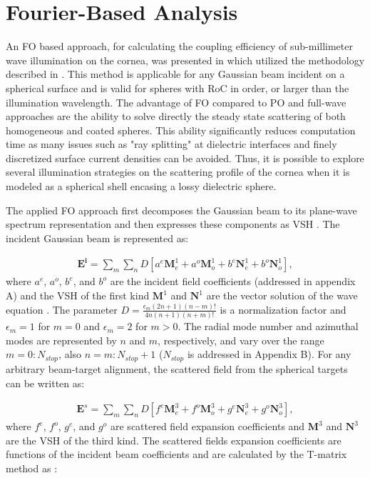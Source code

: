 \documentclass{osa-article}
\begin{document}
\section{Fourier-Based Analysis}

An FO based approach, for calculating the coupling efficiency of sub-millimeter wave illumination on the cornea, was presented in \cite{eucap} which utilized the methodology described in \cite{esam93}. This method is applicable for any Gaussian beam incident on a spherical surface and is valid for spheres with RoC in order, or larger than the illumination wavelength. The advantage of FO compared to PO and full-wave approaches are the ability to solve directly the steady state scattering of both homogeneous and coated spheres. This ability significantly reduces computation time as many issues such as "ray splitting" at dielectric interfaces and finely discretized surface current densities can be avoided. Thus, it is possible to explore several illumination strategies on the scattering profile of the cornea when it is modeled as a spherical shell encasing a lossy dielectric sphere.

The applied FO approach first decomposes the Gaussian beam to its plane-wave spectrum representation and then expresses these components as VSH \cite{esam93}. The incident Gaussian beam is represented as: 

\begin{equation}\label{eq3}
\begin{array}{l}
\mathbf{E^i}=\sum\limits_{m}\sum\limits_{n}D[a^e\mathbf{M}^1_{e}+a^o\mathbf{M}^1_{o}+b^e\mathbf{N}^1_{e}+b^o\mathbf{N}^1_{o}],
\end{array}
\end{equation} 
where $a^e$, $a^o$, $b^e$, and $b^o$ are the incident field coefficients (addressed in appendix A) and the VSH of the first kind $\mathbf{M}^1$ and $\mathbf{N}^1$ are the vector solution of the wave equation \cite{bohrn}. The parameter $D = \frac{\epsilon_m(2n + 1)(n-m)!}{4n(n+ 1)(n + m)!}$ is a normalization factor and $\epsilon_m= 1$ for $m = 0$ and $\epsilon_m= 2$ for $m>0$. The radial mode number and azimuthal modes are represented by $n$ and $m$, respectively, and vary over the range $m = 0:N_{stop}$, also $n =m:N_{stop}+1$ ($N_{stop}$ is addressed in Appendix B). For any arbitrary beam-target alignment, the scattered field from the spherical targets can be written \cite{esam93} as: 

\begin{equation}\label{eq4}
\begin{array}{l}
\mathbf{E}^{s}=\sum\limits_{m}\sum\limits_{n}D[f^e\mathbf{M}^3_e+f^o\mathbf{M}^3_o+g^e\mathbf{N}^3_e+g^o\mathbf{N}^3_o],
\end{array}
\end{equation}
where $f^e$, $f^o$, $g^e$, and $g^o$ are scattered field expansion coefficients and $\mathbf{M}^3$ and $\mathbf{N}^3$ \cite{bohrn} are the VSH of the third kind. The scattered fields expansion coefficients are functions of the incident beam coefficients and are calculated by the T-matrix method as \cite{esam94}:
\end{document}
